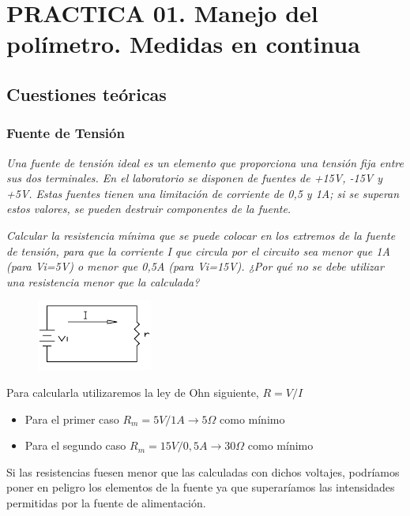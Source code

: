 \documentclass[paper=a4, fontsize=11pt]{scrartcl} %
\numberwithin{equation}{section} %
\numberwithin{figure}{section} %
\numberwithin{table}{section} %
\begin{document}
\newpage


\section{PRACTICA 01. Manejo del polímetro. Medidas en continua \cite{IV}} 

\subsection{Cuestiones teóricas}

\subsubsection{Fuente de Tensión} 

\textit{Una fuente de tensión ideal es un elemento que proporciona una tensión fija entre sus dos terminales. En el laboratorio se disponen de fuentes de +15V, -15V y +5V. Estas fuentes tienen una limitación de corriente de 0,5 y 1A; si se superan estos valores, se pueden destruir componentes de la fuente.} \newline

\textit{Calcular la resistencia mínima que se puede colocar en los extremos de la fuente de tensión, para que la corriente I que circula por el circuito sea menor que 1A (para Vi=5V) o menor que 0,5A (para Vi=15V). ¿Por qué no se debe utilizar una resistencia menor que la calculada?} \newline

\begin{figure}[h]
	\centering
	\includegraphics{image/fuente-tension}
\end{figure}

Para calcularla utilizaremos la ley de Ohn siguiente, $R=V/I$

\begin{itemize}
	\item Para el primer caso $R_{m}=5V/1A \rightarrow 5\Omega$ como mínimo
	\item Para el segundo caso $R_{m}=15V/0,5A \rightarrow 30 \Omega$ como mínimo
\end{itemize}

Si las resistencias fuesen menor que las calculadas con dichos voltajes, podríamos poner en peligro los elementos de la fuente ya que superaríamos las intensidades permitidas por la fuente de alimentación. \newline
\end{document}
